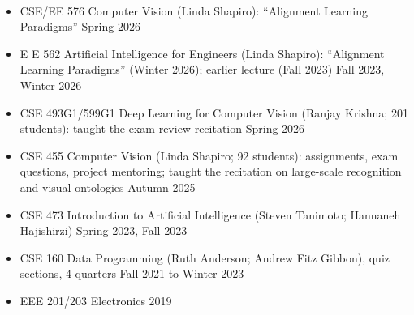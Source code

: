 \documentclass[10pt,letterpaper]{article}
\newcommand{\cvsec}[1]{\vspace{3.2mm}{\large\scshape\bfseries #1}\,\hrulefill\par\vspace{1.6mm}}
\newcommand{\cvsub}[1]{\vspace{1.5mm}{\scshape\bfseries #1}\par\vspace{0.5mm}}
\begin{document}
\cvsec{Teaching}
\cvsub{Guest Lectures}
\begin{itemize}[leftmargin=1.4em,itemsep=1.5pt,topsep=2pt]
  \item CSE/EE 576 Computer Vision (Linda Shapiro): ``Alignment Learning Paradigms'' \hfill Spring 2026
  \item E E 562 Artificial Intelligence for Engineers (Linda Shapiro): ``Alignment Learning Paradigms'' (Winter 2026); earlier lecture (Fall 2023) \hfill Fall 2023, Winter 2026
\end{itemize}
\cvsub{Teaching Assistant, University of Washington}
\begin{itemize}[leftmargin=1.4em,itemsep=1.5pt,topsep=2pt]
  \item CSE 493G1/599G1 Deep Learning for Computer Vision (Ranjay Krishna; 201 students): taught the exam-review recitation \hfill Spring 2026
  \item CSE 455 Computer Vision (Linda Shapiro; 92 students): assignments, exam questions, project mentoring; taught the recitation on large-scale recognition and visual ontologies \hfill Autumn 2025
  \item CSE 473 Introduction to Artificial Intelligence (Steven Tanimoto; Hannaneh Hajishirzi) \hfill Spring 2023, Fall 2023
  \item CSE 160 Data Programming (Ruth Anderson; Andrew Fitz Gibbon), quiz sections, 4 quarters \hfill Fall 2021 to Winter 2023
\end{itemize}
\cvsub{Teaching Assistant, Obafemi Awolowo University}
\begin{itemize}[leftmargin=1.4em,itemsep=1.5pt,topsep=2pt]
  \item EEE 201/203 Electronics \hfill 2019
\end{itemize}
\end{document}
